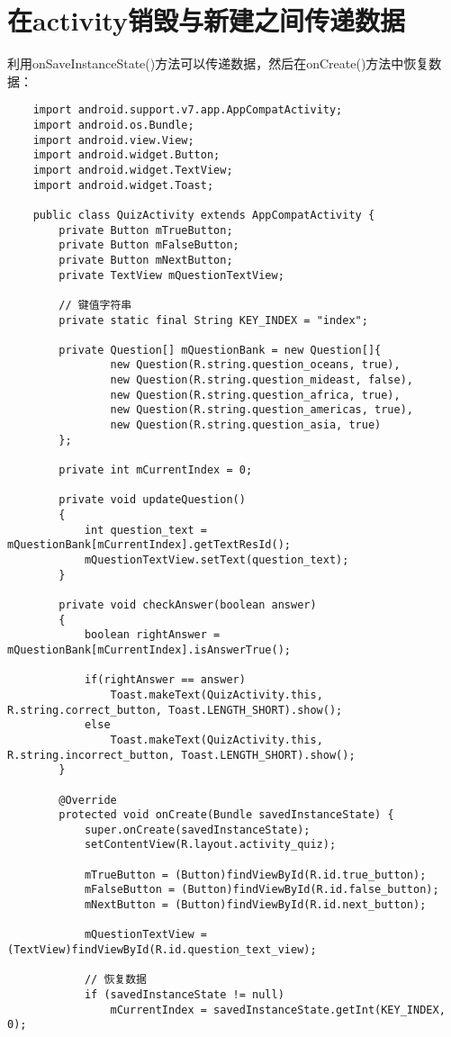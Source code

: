\documentclass[a4paper,left=2.5cm,right=2.5cm,11pt]{article}
\begin{document}


\section{在activity销毁与新建之间传递数据}
	利用onSaveInstanceState()方法可以传递数据，然后在onCreate()方法中恢复数据：
	\begin{lstlisting}
	import android.support.v7.app.AppCompatActivity;
	import android.os.Bundle;
	import android.view.View;
	import android.widget.Button;
	import android.widget.TextView;
	import android.widget.Toast;

	public class QuizActivity extends AppCompatActivity {
		private Button mTrueButton;
		private Button mFalseButton;
		private Button mNextButton;
		private TextView mQuestionTextView;

		// 键值字符串
		private static final String KEY_INDEX = "index";

		private Question[] mQuestionBank = new Question[]{
				new Question(R.string.question_oceans, true),
				new Question(R.string.question_mideast, false),
				new Question(R.string.question_africa, true),
				new Question(R.string.question_americas, true),
				new Question(R.string.question_asia, true)
		};

		private int mCurrentIndex = 0;

		private void updateQuestion()
		{
			int question_text = mQuestionBank[mCurrentIndex].getTextResId();
			mQuestionTextView.setText(question_text);
		}

		private void checkAnswer(boolean answer)
		{
			boolean rightAnswer = mQuestionBank[mCurrentIndex].isAnswerTrue();

			if(rightAnswer == answer)
				Toast.makeText(QuizActivity.this, R.string.correct_button, Toast.LENGTH_SHORT).show();
			else
				Toast.makeText(QuizActivity.this, R.string.incorrect_button, Toast.LENGTH_SHORT).show();
		}

		@Override
		protected void onCreate(Bundle savedInstanceState) {
			super.onCreate(savedInstanceState);
			setContentView(R.layout.activity_quiz);

			mTrueButton = (Button)findViewById(R.id.true_button);
			mFalseButton = (Button)findViewById(R.id.false_button);
			mNextButton = (Button)findViewById(R.id.next_button);

			mQuestionTextView = (TextView)findViewById(R.id.question_text_view);

			// 恢复数据
			if (savedInstanceState != null)
				mCurrentIndex = savedInstanceState.getInt(KEY_INDEX, 0);


\end{lstlisting}
\end{document}
